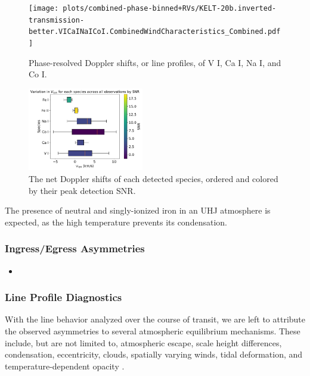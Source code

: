 \documentclass[twocolumn]{aastex631}
\begin{document}
    \begin{figure}[]
        \texttt{[image: plots/combined-phase-binned+RVs/KELT-20b.inverted-transmission-better.VICaINaICoI.CombinedWindCharacteristics\_Combined.pdf]}
        \caption{Phase-resolved Doppler shifts, or line profiles, of V I, Ca I, Na I, and Co I.}
        \label{fig:VICaINaICoI-WindChars}
    \end{figure}
    
    \begin{figure}[]
        \includegraphics[width=0.45\textwidth]{plots/combined-species-snr/KELT-20b.inverted-transmission-better.CombinedSpeciesSNRs.pdf}
        \caption{The net Doppler shifts of each detected species, ordered and colored by their peak detection SNR.}
        \label{fig:combined-species-snr} 
    \end{figure}

        The presence of neutral and singly-ionized iron in an UHJ atmosphere is expected, as the high temperature prevents its condensation.
    
        \subsubsection{Ingress/Egress Asymmetries}\label{subsubsec:Ingress/Egress Asymmetries}
            \begin{itemize}
                \item 
            \end{itemize}
            
        \subsubsection{Line Profile Diagnostics}\label{subsubsec:Wind Profile Diagnostics}
            With the line behavior analyzed over the course of transit, we are left to attribute the observed asymmetries to several atmospheric equilibrium mechanisms. These include, but are not limited to, atmospheric escape, scale height differences, condensation, eccentricity, clouds, spatially varying winds, tidal deformation, and temperature-dependent opacity \citep{Savel2023}. 
\end{document}
